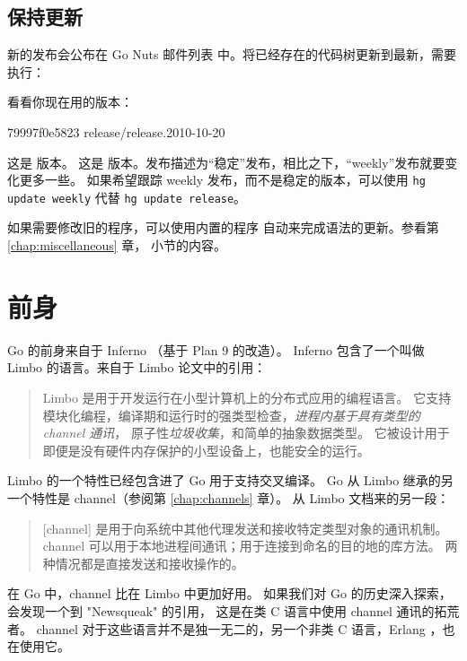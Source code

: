 \subsection{保持更新}
新的发布会公布在 Go Nuts 邮件列表 \cite{go_nuts} 中。将已经存在的代码树更新到最新，需要执行：
\begin{display}
\pr {}
\pr {}
\pr {}
\pr {}
\pr {}
\end{display}
\noindent{}看看你现在用的版本：
\begin{display}
\pr {}
\pr {}
79997f0e5823 release/release.2010-10-20
\end{display}
\noindent{}这是  版本。
\noindent{}这是  版本。发布描述为“稳定”发布，相比之下，“weekly”发布就要变化更多一些。
如果希望跟踪 weekly 发布，而不是稳定的版本，可以使用 \texttt{\pr hg update weekly} 代替 \texttt{\pr hg update release}。

如果需要修改旧的程序，可以使用内置的程序  
自动来完成语法的更新。参看第 \ref{chap:miscellaneous} 章， 小节的内容。

\section{前身}
Go 的前身来自于 Inferno \cite{inferno} （基于 Plan 9 \cite{plan9} 的改造）。
Inferno 包含了一个叫做 Limbo \cite{limbo} 的语言。来自于 Limbo 论文中的引用：
\begin{quote}
Limbo 是用于开发运行在小型计算机上的分布式应用的编程语言。
它支持模块化编程，编译期和运行时的强类型检查，\emph{进程内基于具有类型的 channel 通讯}，
原子性\emph{垃圾收集}，和简单的抽象数据类型。
它被设计用于即便是没有硬件内存保护的小型设备上，也能安全的运行。
\end{quote}
Limbo 的一个特性已经包含进了 Go 用于支持交叉编译。
Go 从 Limbo 继承的另一个特性是 channel（参阅第 \ref{chap:channels} 章）。
从 Limbo 文档来的另一段：
\begin{quote}
[channel] 是用于向系统中其他代理发送和接收特定类型对象的通讯机制。
channel 可以用于本地进程间通讯；用于连接到命名的目的地的库方法。
两种情况都是直接发送和接收操作的。
\end{quote}
在 Go 中，channel 比在 Limbo 中更加好用。
如果我们对 Go 的历史深入探索，会发现一个到 "Newsqueak" \cite{newsqueak} 的引用，
这是在类 C 语言中使用 channel 通讯的拓荒者。
channel 对于这些语言并不是独一无二的，另一个非类 C 语言，Erlang \cite{erlang}，也在使用它。

